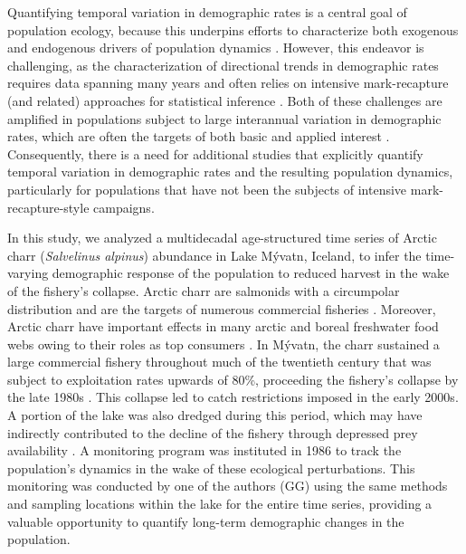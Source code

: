 \documentclass[11pt]{article}
\begin{document}
Quantifying temporal variation in demographic rates is a central goal of population ecology,
because this underpins efforts to characterize both exogenous and 
endogenous drivers of population dynamics 
\citep{twombly1994comparative, zeng1998, koons2016life}.
However, this endeavor is challenging, 
as the characterization of directional trends in demographic rates requires
data spanning many years and 
often relies on intensive mark-recapture (and related) approaches for statistical inference
\citep[e.g.,][]{forcada2008life, hunter2010climate}.
Both of these challenges are amplified in populations subject to large interannual variation
in demographic rates, 
which are often the targets of both basic and applied interest
\citep[e.g.,][]{white2007irruptive}.
Consequently, 
there is a need for additional studies that 
explicitly quantify temporal variation in demographic rates 
and the resulting population dynamics, 
particularly for populations that have not been the subjects 
of intensive mark-recapture-style campaigns.

In this study, we analyzed a multidecadal age-structured time series 
of Arctic charr (\emph{Salvelinus alpinus}) abundance in Lake M\'{y}vatn, Iceland, 
to infer the time-varying demographic response of the population 
to reduced harvest in the wake of the fishery's collapse.
Arctic charr are salmonids with a circumpolar distribution
and are the targets of 
numerous commercial fisheries \citep{klemetsen2003atlantic}.
Moreover,
Arctic charr have important effects in many arctic 
and boreal freshwater food webs owing to their roles as top consumers
\citep{jeppesen2001fish, klemetsen2003atlantic}.
In M\'{y}vatn, the charr sustained a large commercial fishery throughout much of the 
twentieth century that was subject to exploitation rates upwards of 80\%,
proceeding the fishery's collapse by the late 1980s \citep{gudbergsson2004}.
This collapse led to catch restrictions imposed in the early 2000s.
A portion of the lake was also dredged during this period,
which may have indirectly contributed to the decline of the fishery
through depressed prey availability \citep{einarsson2004myvatn}.
A monitoring program was instituted in 1986 to track the population's
dynamics in the wake of these ecological perturbations.
This monitoring was conducted by one of the authors (GG) 
using the same methods and sampling locations within the lake 
for the entire time series,
providing a valuable opportunity to quantify 
long-term demographic changes in the population.
\end{document}
